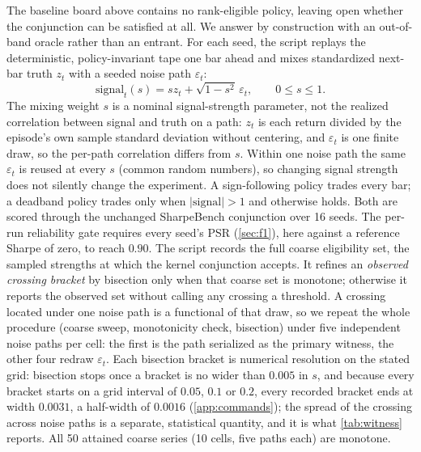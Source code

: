 The baseline board above contains no rank-eligible policy, leaving open whether the conjunction can be satisfied at all. We answer by construction with an out-of-band oracle rather than an entrant. For each seed, the script replays the deterministic, policy-invariant tape one bar ahead and mixes standardized next-bar truth $z_t$ with a seeded noise path $\varepsilon_t$:
\[
\mathrm{signal}_t(s)=s z_t+\sqrt{1-s^2}\,\varepsilon_t,
\qquad 0\le s\le1.
\]
The mixing weight $s$ is a nominal signal-strength parameter, not the realized correlation between signal and truth on a path: $z_t$ is each return divided by the episode's own sample standard deviation without centering, and $\varepsilon_t$ is one finite draw, so the per-path correlation differs from $s$. Within one noise path the same $\varepsilon_t$ is reused at every $s$ (common random numbers), so changing signal strength does not silently change the experiment. A sign-following policy trades every bar; a deadband policy trades only when $|\mathrm{signal}|>1$ and otherwise holds. Both are scored through the unchanged SharpeBench conjunction over 16 seeds. The per-run reliability gate requires every seed's PSR (\cref{sec:f1}), here against a reference Sharpe of zero, to reach $0.90$. The script records the full coarse eligibility set, the sampled strengths at which the kernel conjunction accepts. It refines an \emph{observed crossing bracket} by bisection only when that coarse set is monotone; otherwise it reports the observed set without calling any crossing a threshold. A crossing located under one noise path is a functional of that draw, so we repeat the whole procedure (coarse sweep, monotonicity check, bisection) under five independent noise paths per cell: the first is the path serialized as the primary witness, the other four redraw $\varepsilon_t$. Each bisection bracket is numerical resolution on the stated grid: bisection stops once a bracket is no wider than $0.005$ in $s$, and because every bracket starts on a grid interval of $0.05$, $0.1$ or $0.2$, every recorded bracket ends at width $0.0031$, a half-width of $0.0016$ (\cref{app:commands}); the spread of the crossing across noise paths is a separate, statistical quantity, and it is what \cref{tab:witness} reports. All 50 attained coarse series (10 cells, five paths each) are monotone.

